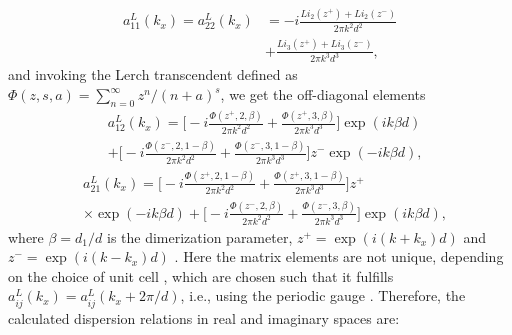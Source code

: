 \documentclass[aps,pra,reprint,groupedaddress,nofootinbib,longbibliography,showpacs]{revtex4-1}
\begin{document}
\begin{equation}
\begin{split}
a_{11}^{L}(k_x)=a_{22}^{L}(k_x)&=-i\frac{Li_2(z^+)+Li_2(z^-)}{2\pi k^2d^2}\\&+\frac{Li_3(z^+)+Li_3(z^-)}{2\pi k^3d^3},
\end{split}
\end{equation}
and invoking the Lerch transcendent defined as $\Phi(z,s,a)=\sum_{n=0}^\infty z^n/(n+a)^s$, we get the off-diagonal elements
\begin{equation}\label{a12Leq}
\begin{split}
&a_{12}^{L}(k_x)=\Big[-i\frac{\Phi(z^+,2,\beta)}{2\pi k^2d^2}+\frac{\Phi(z^+,3,\beta)}{2\pi k^3d^3}\Big]\exp{(ik\beta d)}\\&+\Big[-i\frac{\Phi(z^-,2,1-\beta)}{2\pi k^2d^2}+\frac{\Phi(z^-,3,1-\beta)}{2\pi k^3d^3}\Big]z^-\exp{(-ik\beta d)},
\end{split}
\end{equation}
\begin{equation}\label{a21Leq}
\begin{split}
&a_{21}^{L}(k_x)=\Big[-i\frac{\Phi(z^+,2,1-\beta)}{2\pi k^2d^2}+\frac{\Phi(z^+,3,1-\beta)}{2\pi k^3d^3}\Big]z^+\\&\times\exp{(-ik\beta d)}+\Big[-i\frac{\Phi(z^-,2,\beta)}{2\pi k^2d^2}+\frac{\Phi(z^-,3,\beta)}{2\pi k^3d^3}\Big]\exp{(ik\beta d)},
\end{split}
\end{equation}
where $\beta=d_1/d$ is the dimerization parameter, $z^+=\exp{(i(k+k_x)d)}$ and $z^-=\exp{(i(k-k_x)d)}$ \cite{pocockArxiv2017}. Here the matrix elements are not unique, depending on the choice of unit cell \cite{atalaNaturephys2013}, which are chosen such that it fulfills $a_{ij}^L(k_x)=a_{ij}^L(k_x+2\pi/d)$, i.e., using the periodic gauge \cite{lingOE2015,ozawa2018topological}. Therefore, the calculated dispersion relations in real and imaginary spaces are:
\end{document}
